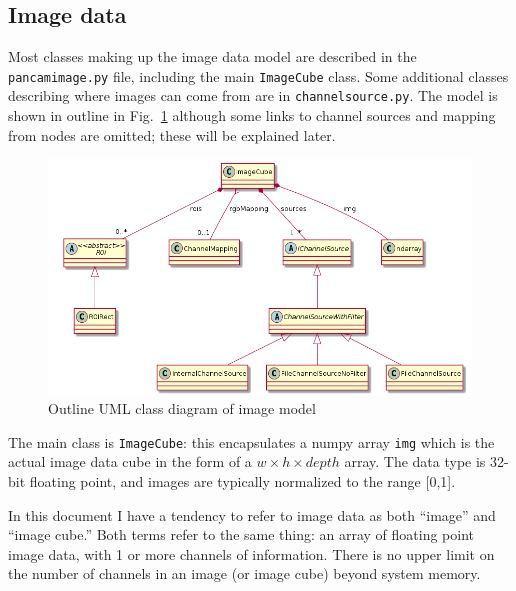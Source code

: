 \subsection{Image data}
Most classes making up the image data 
model are described in the \texttt{pancamimage.py} file, including the main \texttt{ImageCube}
class. Some additional classes describing where images can come from are in \texttt{channelsource.py}.
The model is shown in outline in Fig.~\ref{image.png} although some links to channel sources
and mapping from nodes are omitted; these will be explained later.

\begin{figure}[ht]
\center
\includegraphics[width=5in]{image.png}
\caption{Outline UML class diagram of image model}
\label{image.png}
\end{figure}

The main class is \texttt{ImageCube}: this encapsulates a numpy array
\texttt{img}
which is the actual image data cube in the form
of a $w \times h \times depth$ array. The data type is 32-bit floating
point, and images are typically normalized to the range [0,1].

\begin{notebox}
In this document I have a tendency to refer to image data as both ``image'' and ``image cube.''
Both terms refer to the same thing: an array of floating point image data, with 1 or more channels
of information. There is no upper limit on the number of channels in an image (or image cube)
beyond system memory.
\end{notebox}


